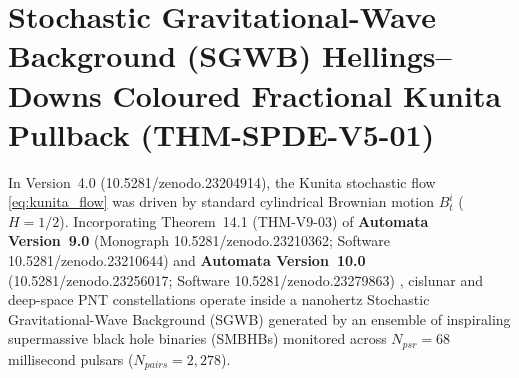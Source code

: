 \documentclass[11pt,a4paper,reqno]{article}
\def\texttt#1{#1}%
\def\mathrm#1{#1}%
\def\zenodo#1{10.5281/zenodo.#1}%
\newcommand{\zenodo}[1]{\href{https://doi.org/10.5281/zenodo.#1}{\texttt{10.5281/\allowbreak zenodo.#1}}}
\theoremstyle{plain}
\theoremstyle{definition}
\theoremstyle{remark}
\numberwithin{equation}{section}
\begin{document}
\section{Stochastic Gravitational-Wave Background (SGWB) Hellings--Downs Coloured Fractional Kunita Pullback (\texttt{THM-SPDE-V5-01})}
\label{sec:spde_v5_sgwb_fractional_pullback}

In Version~4.0 (\zenodo{23204914}), the Kunita stochastic flow \eqref{eq:kunita_flow} was driven by standard cylindrical Brownian motion $B_t^i$ ($H = 1/2$). Incorporating Theorem~14.1 (\texttt{THM-V9-03}) of \textbf{Automata Version~9.0} (Monograph \zenodo{23210362}; Software \zenodo{23210644}) \cite{ananda2026automata_v90} and \textbf{Automata Version~10.0} (\zenodo{23256017}; Software \zenodo{23279863}) \cite{ananda2026automata_v100}, cislunar and deep-space PNT constellations operate inside a nanohertz Stochastic Gravitational-Wave Background (SGWB) generated by an ensemble of inspiraling supermassive black hole binaries (SMBHBs) monitored across $N_{\mathrm{psr}} = 68$ millisecond pulsars ($N_{\mathrm{pairs}} = 2{,}278$).
\end{document}
